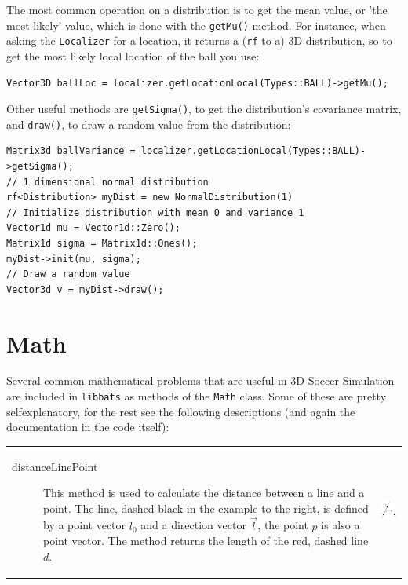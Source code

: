 The most common operation on a distribution is to get the mean value, or 'the most likely' value, which is done with the {\tt getMu()} method. For instance, when asking the {\tt Localizer} for a location, it returns a ({\tt rf} to a) 3D distribution, so to get the most likely local location of the ball you use:
\begin{lstlisting}[frame=single]
Vector3D ballLoc = localizer.getLocationLocal(Types::BALL)->getMu();
\end{lstlisting}

Other useful methods are {\tt getSigma()}, to get the distribution's covariance matrix, and {\tt draw()}, to draw a random value from the distribution:
\begin{lstlisting}[frame=single]
Matrix3d ballVariance = localizer.getLocationLocal(Types::BALL)->getSigma();
// 1 dimensional normal distribution
rf<Distribution> myDist = new NormalDistribution(1)
// Initialize distribution with mean 0 and variance 1
Vector1d mu = Vector1d::Zero();
Matrix1d sigma = Matrix1d::Ones();
myDist->init(mu, sigma);
// Draw a random value
Vector3d v = myDist->draw();
\end{lstlisting}

\section{Math}
Several common mathematical problems that are useful in 3D Soccer Simulation are included in {\tt libbats} as methods of the {\tt Math} class. Some of these are pretty selfexplenatory, for the rest see the following descriptions (and again the documentation in the code itself):

\begin{tabular}{l l}
\begin{minipage}{0.7\textwidth}
\begin{description}
\item[distanceLinePoint] This method is used to calculate the distance between a line and a point. The line, dashed black in the example to the right, is defined by a point vector $l_0$ and a direction vector $\vec{l}$, the point $p$ is also a point vector. The method returns the length of the red, dashed line $d$.
\end{description}
\end{minipage}
&
\begin{minipage}{0.3\textwidth}
\includegraphics[width=2.5cm]{distlp.png}
\end{minipage}
\end{tabular}

